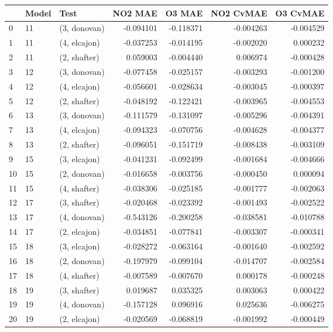 \begin{tabular}{lllrrrr}
\toprule
{} & Model &          Test &   NO2 MAE &    O3 MAE &  NO2 CvMAE &  O3 CvMAE \\
\midrule
0  &    11 &  (3, donovan) & -0.094101 & -0.118371 &  -0.004263 & -0.004529 \\
1  &    11 &  (4, elcajon) & -0.037253 & -0.014195 &  -0.002020 &  0.000232 \\
2  &    11 &  (2, shafter) &  0.059003 & -0.004440 &   0.006974 & -0.000428 \\
3  &    12 &  (3, donovan) & -0.077458 & -0.025157 &  -0.003293 & -0.001200 \\
4  &    12 &  (4, elcajon) & -0.056601 & -0.028634 &  -0.003045 & -0.000397 \\
5  &    12 &  (2, shafter) & -0.048192 & -0.122421 &  -0.003965 & -0.004553 \\
6  &    13 &  (3, donovan) & -0.111579 & -0.131097 &  -0.005296 & -0.004391 \\
7  &    13 &  (4, elcajon) & -0.094323 & -0.070756 &  -0.004628 & -0.004377 \\
8  &    13 &  (2, shafter) & -0.096051 & -0.151719 &  -0.008438 & -0.003109 \\
9  &    15 &  (3, elcajon) & -0.041231 & -0.092499 &  -0.001684 & -0.004666 \\
10 &    15 &  (2, donovan) & -0.016658 & -0.003756 &  -0.000450 &  0.000094 \\
11 &    15 &  (4, shafter) & -0.038306 & -0.025185 &  -0.001777 & -0.002063 \\
12 &    17 &  (3, shafter) & -0.020468 & -0.023392 &  -0.001493 & -0.002522 \\
13 &    17 &  (4, donovan) & -0.543126 & -0.200258 &  -0.038581 & -0.010788 \\
14 &    17 &  (2, elcajon) & -0.034851 & -0.077841 &  -0.003307 & -0.000341 \\
15 &    18 &  (3, elcajon) & -0.028272 & -0.063164 &  -0.001640 & -0.002592 \\
16 &    18 &  (2, donovan) & -0.197979 & -0.099104 &  -0.014707 & -0.002584 \\
17 &    18 &  (4, shafter) & -0.007589 & -0.007670 &   0.000178 & -0.000248 \\
18 &    19 &  (3, shafter) &  0.019687 &  0.035325 &   0.003063 &  0.000422 \\
19 &    19 &  (4, donovan) & -0.157128 &  0.096916 &   0.025636 & -0.006275 \\
20 &    19 &  (2, elcajon) & -0.020569 & -0.068819 &  -0.001992 & -0.000449 \\

\end{tabular}
